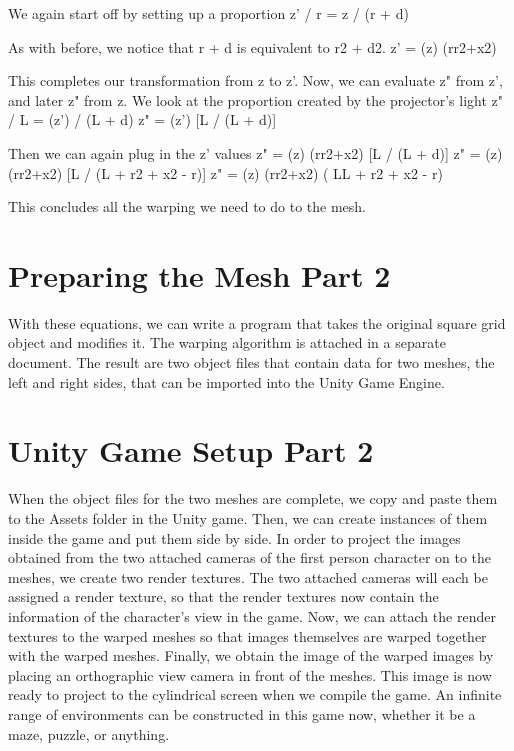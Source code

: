 \documentclass[a4paper]{article}
\begin{document}
We again start off by setting up a proportion
z' / r = z / (r + d)



As with before, we notice that r + d is equivalent to r2 + d2. 
z' = (z) (rr2+x2)

This completes our transformation from z to z'. Now, we can evaluate z" from z', and later z" from z. We look at the proportion created by the projector’s light
z" / L = (z')  / (L + d)
z" = (z') [L / (L + d)]

Then we can again plug in the z' values 
z" =  (z) (rr2+x2) [L / (L + d)]
z" =  (z) (rr2+x2) [L / (L +  r2 + x2 - r)]
z" =  (z) (rr2+x2) ( LL +  r2 + x2 - r)

This concludes all the warping we need to do to the mesh. 

\section{Preparing the Mesh Part 2}

	With these equations, we can write a program that takes the original square grid object and modifies it. The warping algorithm is attached in a separate document. The result are two object files that contain data for two meshes, the left and right sides, that can be imported into the Unity Game Engine. 

\section{Unity Game Setup Part 2}

	When the object files for the two meshes are complete, we copy and paste them to the Assets folder in the Unity game. Then, we can create instances of them inside the game and put them side by side. In order to project the images obtained from the two attached cameras of the first person character on to the meshes, we create two render textures. The two attached cameras will each be assigned a render texture, so that the render textures now contain the information of the character’s view in the game. Now, we can attach the render textures to the warped meshes so that images themselves are warped together with the warped meshes. Finally, we obtain the image of the warped images by placing an orthographic view camera in front of the meshes. This image is now ready to project to the cylindrical screen when we compile the game. An infinite range of environments can be constructed in this game now, whether it be a maze, puzzle, or anything. 
\end{document}
